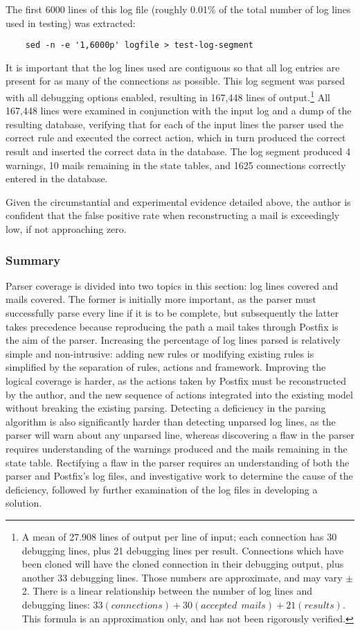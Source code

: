 The first 6000 lines of this log file (roughly 0.01\% of the total number
of log lines used in testing) was extracted:

\verb!    sed -n -e '1,6000p' logfile > test-log-segment!

It is important that the log lines used are contiguous so that all log
entries are present for as many of the connections as possible.  This log
segment was parsed with all debugging options enabled, resulting in 167,448
lines of output.\footnote{A mean of 27.908 lines of output per line of
input; each connection has 30 debugging lines, plus 21 debugging lines per
result.  Connections which have been cloned will have the cloned connection
in their debugging output, plus another 33 debugging lines.  Those numbers
are approximate, and may vary $\pm{}$ 2.  There is a linear relationship
between the number of log lines and debugging lines: $33(connections) +
30(accepted~~mails) + 21(results)$.  This formula is an approximation only,
and has not been rigorously verified.}  All 167,448 lines were examined in
conjunction with the input log and a dump of the resulting database,
verifying that for each of the input lines the parser used the correct rule
and executed the correct action, which in turn produced the correct result
and inserted the correct data in the database.  The log segment produced 4
warnings, 10 mails remaining in the state tables, and 1625 connections
correctly entered in the database.

Given the circumstantial and experimental evidence detailed above, the
author is confident that the false positive rate when reconstructing a mail
is exceedingly low, if not approaching zero.

\subsubsection{Summary}

Parser coverage is divided into two topics in this section: log lines
covered and mails covered.  The former is initially more important, as the
parser must successfully parse every line if it is to be complete, but
subsequently the latter takes precedence because reproducing the path a
mail takes through Postfix is the aim of the parser.  Increasing the
percentage of log lines parsed is relatively simple and non-intrusive:
adding new rules or modifying existing rules is simplified by the
separation of rules, actions and framework.  Improving the logical coverage
is harder, as the actions taken by Postfix must be reconstructed by the
author, and the new sequence of actions integrated into the existing model
without breaking the existing parsing.  Detecting a deficiency in the
parsing algorithm is also significantly harder than detecting unparsed log
lines, as the parser will warn about any unparsed line, whereas discovering
a flaw in the parser requires understanding of the warnings produced and
the mails remaining in the state table.  Rectifying a flaw in the parser
requires an understanding of both the parser and Postfix's log files, and
investigative work to determine the cause of the deficiency, followed by
further examination of the log files in developing a solution.

